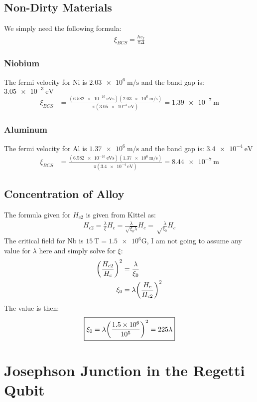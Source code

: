 \documentclass[12pt]{article}
\begin{document}
\subsection{Non-Dirty Materials}
We simply need the following formula:
\begin{align*}
  \xi_{BCS}=\frac{\hbar v_f}{\pi\Delta}
\end{align*}
\subsubsection{Niobium}
The fermi velocity for Ni is $\SI{2.03e6}{\m\per\s}$ and the band gap is: $\SI{3.05e-3}{\eV}$
\begin{align*}
  \xi_{BCS}&=\frac{(\SI{6.582e-16}{\eV\s})(\SI{2.03e6}{\m\per\s})}
  {\pi(\SI{3.05e-3}{\eV})}=\boxed{\SI{1.39e-7}{\m}}
\end{align*}
\subsubsection{Aluminum}
The fermi velocity for Al is $\SI{1.37e6}{\m\per\s}$ and the band gap is: $\SI{3.4e-4}{\eV}$
\begin{align*}
  \xi_{BCS}&=\frac{(\SI{6.582e-16}{\eV\s})(\SI{1.37e6}{\m\per\s})}
  {\pi(\SI{3.4e-4}{\eV})}=\boxed{\SI{8.44e-7}{\m}}
\end{align*}

\subsection{Concentration of Alloy}
The formula given for $H_{c2}$ is given from Kittel as:
\begin{align*}
  H_{c2}=\frac{\lambda}{\xi}H_c=\frac{\lambda}{\sqrt{\xi_0\lambda}}H_c
  =\sqrt\frac{\lambda}{\xi_0}H_c
\end{align*}
The critical field for Nb is $\SI{15}{\tesla}=\num{1.5e6}\text{G}$, I am not going to assume any value for $\lambda$ here and simply solve for $\xi$:
\begin{align*}
  \qty(\frac{H_{c2}}{H_c})^2&=\frac{\lambda}{\xi_0}\\
  \xi_0&=\lambda\qty(\frac{H_c}{H_{c2}})^2
\end{align*}
The value is then:
\begin{align*}
  \boxed{\xi_0=\lambda\qty(\frac{\num{1.5e6}}{10^5})^2=225\lambda}
\end{align*}
\newpage\section{Josephson Junction in the Regetti Qubit}
\end{document}
